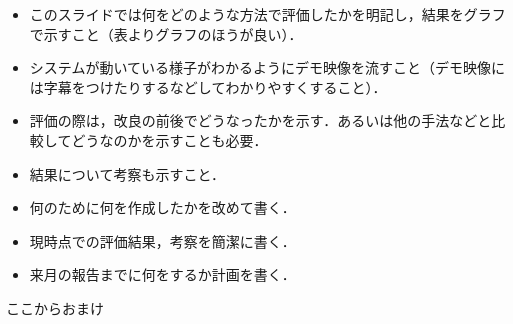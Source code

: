 \begin{itemize}
	\item このスライドでは何をどのような方法で評価したかを明記し，結果をグラフで示すこと（表よりグラフのほうが良い）．
	\item システムが動いている様子がわかるようにデモ映像を流すこと（デモ映像には字幕をつけたりするなどしてわかりやすくすること）．
	\item 評価の際は，改良の前後でどうなったかを示す．あるいは他の手法などと比較してどうなのかを示すことも必要．
	\item 結果について考察も示すこと．
\end{itemize}
\newpage

\begin{itemize}
	\item 何のために何を作成したかを改めて書く．
	\item 現時点での評価結果，考察を簡潔に書く．
	\item 来月の報告までに何をするか計画を書く．
\end{itemize}
\newpage

ここからおまけ




 
